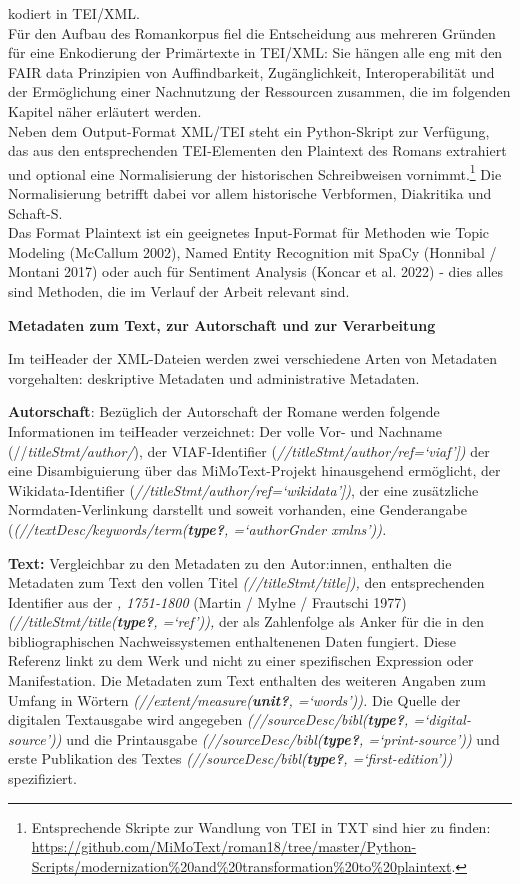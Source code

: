 \documentclass[
  12pt,
  letterpaper,
  DIV=11,
  numbers=noendperiod]{scrreprt}
\begin{document}
kodiert in TEI/XML.\\
Für den Aufbau des Romankorpus fiel die Entscheidung aus mehreren
Gründen für eine Enkodierung der Primärtexte in TEI/XML: Sie hängen alle
eng mit den FAIR data Prinzipien von Auffindbarkeit, Zugänglichkeit,
Interoperabilität und der Ermöglichung einer Nachnutzung der Ressourcen
zusammen, die im folgenden Kapitel näher erläutert werden.\\
Neben dem Output-Format XML/TEI steht ein Python-Skript zur Verfügung,
das aus den entsprechenden TEI-Elementen den Plaintext des Romans
extrahiert und optional eine Normalisierung der historischen
Schreibweisen vornimmt.\footnote{Entsprechende Skripte zur Wandlung von
  TEI in TXT sind hier zu finden:
  \url{https://github.com/MiMoText/roman18/tree/master/Python-Scripts/modernization\%20and\%20transformation\%20to\%20plaintext}.}
Die Normalisierung betrifft dabei vor allem historische Verbformen,
Diakritika und Schaft-S.\\
Das Format Plaintext ist ein geeignetes Input-Format für Methoden wie
Topic Modeling (McCallum 2002), Named Entity Recognition mit SpaCy
(Honnibal / Montani 2017) oder auch für Sentiment Analysis (Koncar et
al. 2022) - dies alles sind Methoden, die im Verlauf der Arbeit relevant
sind.

\textbf{Metadaten zum Text, zur Autorschaft und zur Verarbeitung}

Im teiHeader der XML-Dateien werden zwei verschiedene Arten von
Metadaten vorgehalten: deskriptive Metadaten und administrative
Metadaten.

\textbf{Autorschaft}: Bezüglich der Autorschaft der Romane werden
folgende Informationen im teiHeader verzeichnet: Der volle Vor- und
Nachname (//\emph{titleStmt/author/}), der VIAF-Identifier
(\emph{//titleStmt/author/ref=`viaf'{]})} der eine Disambiguierung über
das MiMoText-Projekt hinausgehend ermöglicht, der Wikidata-Identifier
(\emph{//titleStmt/author/ref=`wikidata'{]})}, der eine zusätzliche
Normdaten-Verlinkung darstellt und soweit vorhanden, eine Genderangabe
(\emph{(//textDesc/keywords/term(\textbf{type?}, =`authorGnder
xmlns')).}

\textbf{Text:} Vergleichbar zu den Metadaten zu den Autor:innen,
enthalten die Metadaten zum Text den vollen Titel
\emph{(//titleStmt/title{]}),} den entsprechenden Identifier aus der
\emph{, 1751-1800} (Martin / Mylne / Frautschi
1977)\emph{(//titleStmt/title(\textbf{type?}, =`ref')),} der als
Zahlenfolge als Anker für die in den bibliographischen Nachweissystemen
enthaltenenen Daten fungiert. Diese Referenz linkt zu dem Werk und nicht
zu einer spezifischen Expression oder Manifestation. Die Metadaten zum
Text enthalten des weiteren Angaben zum Umfang in Wörtern
\emph{(//extent/measure(\textbf{unit?}, =`words')).} Die Quelle der
digitalen Textausgabe wird angegeben
\emph{(//sourceDesc/bibl(\textbf{type?}, =`digital-source'))} und die
Printausgabe \emph{(//sourceDesc/bibl(\textbf{type?}, =`print-source'))}
und erste Publikation des Textes
\emph{(//sourceDesc/bibl(\textbf{type?}, =`first-edition'))}
spezifiziert.
\end{document}
